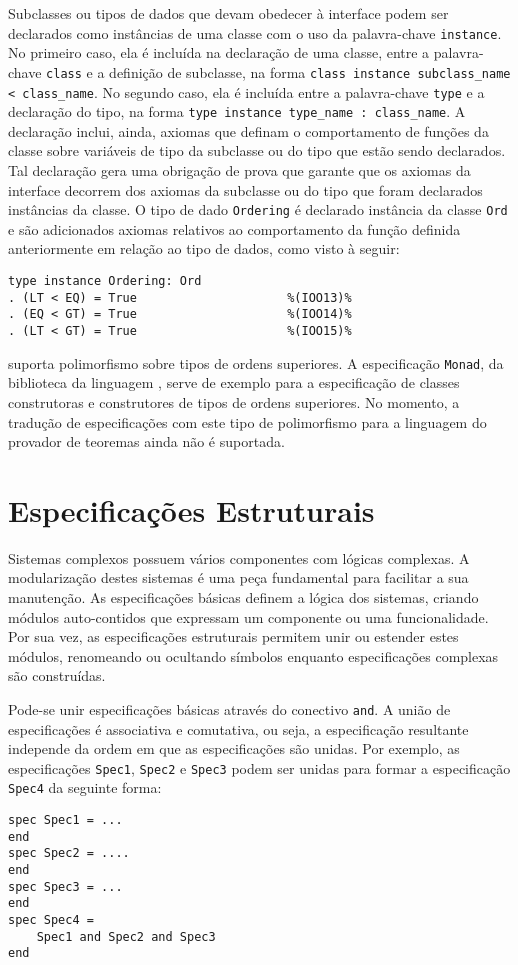 Subclasses ou tipos de dados que devam obedecer à interface podem ser declarados como instâncias de uma classe com o uso da palavra-chave \Verb.instance.. No primeiro caso, ela é incluída na declaração de uma classe, entre a palavra-chave \Verb.class. e a definição de subclasse, na forma \Verb.class instance subclass_name < class_name.. No segundo caso, ela é incluída entre a palavra-chave \Verb.type. e a declaração do tipo, na forma \Verb.type instance type_name : class_name..
A declaração inclui, ainda, axiomas que definam o comportamento de funções da classe sobre variáveis de tipo da subclasse ou do tipo que estão sendo declarados.
Tal declaração gera uma obrigação de prova que garante que os axiomas da interface decorrem dos axiomas da subclasse ou do tipo que foram declarados instâncias da classe.
O tipo de dado \Verb.Ordering. é declarado instância da classe \Verb.Ord. e são adicionados axiomas relativos ao comportamento da função definida anteriormente em relação ao tipo de dados, como visto à seguir:
\begin{Verbatim}
type instance Ordering: Ord
. (LT < EQ) = True                     %(IOO13)%
. (EQ < GT) = True                     %(IOO14)%
. (LT < GT) = True                     %(IOO15)%
\end{Verbatim}

\HasCASL suporta polimorfismo sobre tipos de ordens superiores.
A especificação \Verb.Monad., da biblioteca da linguagem \CASL, serve de exemplo para a especificação de classes construtoras e construtores de tipos de ordens superiores.
No momento, a tradução de especificações com este tipo de polimorfismo para a linguagem do provador de teoremas ainda não é suportada.

\section{Especificações Estruturais}
Sistemas complexos possuem vários componentes com lógicas complexas.
A modularização destes sistemas é uma peça fundamental para facilitar a sua manutenção.
As especificações básicas definem a lógica dos sistemas, criando módulos auto-contidos que expressam um componente ou uma funcionalidade.
Por sua vez, as especificações estruturais permitem unir ou estender estes módulos, renomeando ou ocultando símbolos enquanto especificações complexas são construídas.

Pode-se unir especificações básicas através do conectivo \Verb.and..
A união de especificações é associativa e comutativa, ou seja, a especificação resultante independe da ordem em que as especificações são unidas.
Por exemplo, as especificações \Verb.Spec1., \Verb.Spec2. e \Verb.Spec3. podem ser unidas para formar a especificação \Verb.Spec4. da seguinte forma:
\begin{Verbatim}
spec Spec1 = ...
end
spec Spec2 = ....
end
spec Spec3 = ...
end
spec Spec4 =
 	Spec1 and Spec2 and Spec3
end
\end{Verbatim}

